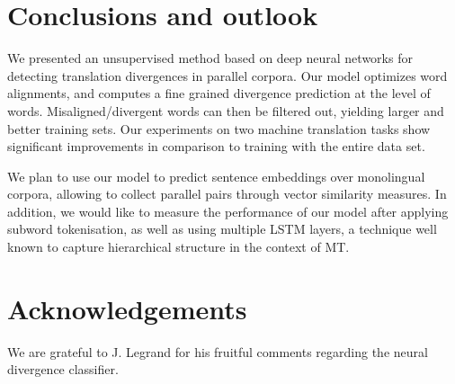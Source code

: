 \documentclass[11pt,a4paper]{article}
\begin{document}
\section{Conclusions and outlook}
\label{conclusions+further}

We presented an unsupervised method based on deep neural networks for detecting translation divergences in parallel corpora. 
Our model optimizes word alignments, and computes a fine grained divergence prediction at the level of words. 
Misaligned/divergent words can then be filtered out, yielding larger and better training sets. 
Our experiments on two machine translation tasks show significant improvements in comparison to training with the entire data set. 

We plan to use our model to predict sentence embeddings over monolingual corpora, allowing to collect parallel pairs through vector similarity measures.
In addition, we would like to measure the performance of our model after applying subword tokenisation,
as well as using multiple LSTM layers, a technique well known to capture hierarchical structure in the context of MT.

\section*{Acknowledgements}
We are grateful to J. Legrand for his fruitful comments regarding the neural divergence classifier.



\end{document}
